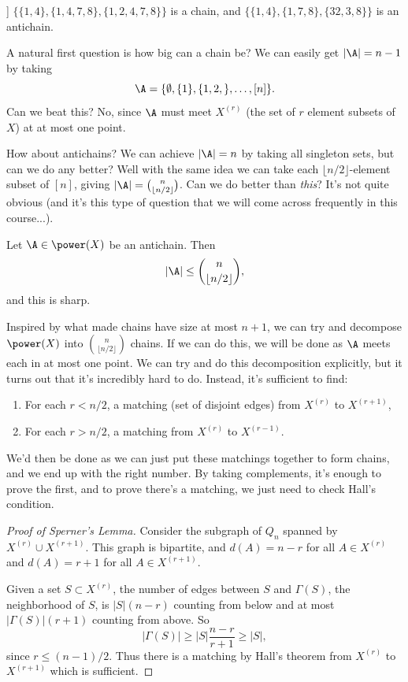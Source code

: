 \begin{example}]
    $\{\{1, 4\}, \{1, 4, 7, 8\}, \{1, 2, 4, 7, 8\}\}$ is a chain, and  $\{\{1, 4\}, \{1, 7, 8\}, \{32, 3, 8\}\}$ is an antichain.
\end{example}

A natural first question is how big can a chain be? We can easily get $|\A| = n - 1$ by taking
$$
\A = \{\emptyset, \{1\}, \{1, 2, \}, \dots, [n]\}.
$$
Can we beat this? No, since $\A$ must meet $X^{(r)}$ (the set of $r$ element subsets of $X$) at at most one point.

How about antichains? We can achieve $|\A| = n$ by taking all singleton sets, but can we do any better? Well with the same idea we can take each $\lfloor n/2\rfloor$-element subset of $[n]$, giving $|\A| = \binom{n}{\lfloor n/2\rfloor}$. Can we do better than \emph{this}? It's not quite obvious (and it's this type of question that we will come across frequently in this course...).

\begin{theorem}\label{sperner}
    Let $\A \in \power(X)$ be an antichain. Then
    $$
    |\A| \leq \binom{n}{\lfloor n/2 \rfloor},
    $$
    and this is sharp.
\end{theorem}

Inspired by what made chains have size at most $n + 1$, we can try and decompose $\power (X)$ into $\binom{n}{\lfloor n/2 \rfloor}$ chains. If we can do this, we will be done as $\A$ meets each in at most one point.
We can try and do this decomposition explicitly, but it turns out that it's incredibly hard to do. 
Instead, it's sufficient to find:

\begin{enumerate}
    \item For each $r < n/2$, a matching (set of disjoint edges) from $X^{(r)}$ to $X^{(r + 1)}$,
    \item For each $r > n/2$, a matching from $X^{(r)}$ to $X^{(r - 1)}$.
\end{enumerate}
We'd then be done as we can just put these matchings together to form chains, and we end up with the right number. By taking complements, it's enough to prove the first, and to prove there's a matching, we just need to check Hall's condition.

\begin{proof}[Proof of Sperner's Lemma]
    Consider the subgraph of $Q_n$ spanned by $X^{(r)}\cup X^{(r + 1)}$. This graph is bipartite, and $d(A) = n - r$ for all $A \in X^{(r)}$ and $d(A) = r + 1$ for all $A \in X^{(r + 1)}$.

    Given a set $S \subset X^{(r)}$, the number of edges between $S$ and $\Gamma(S)$, the neighborhood of $S$, is
    $|S|(n - r)$ counting from below and at most $|\Gamma(S)|(r + 1)$ counting from above. So
    $$
    |\Gamma(S)| \geq |S| \frac{n - r}{r + 1} \geq |S|,
    $$
    since $r \leq (n - 1)/2$. Thus there is a matching by Hall's theorem from $X^{(r)}$ to $X^{(r + 1)}$ which is sufficient.
\end{proof}

